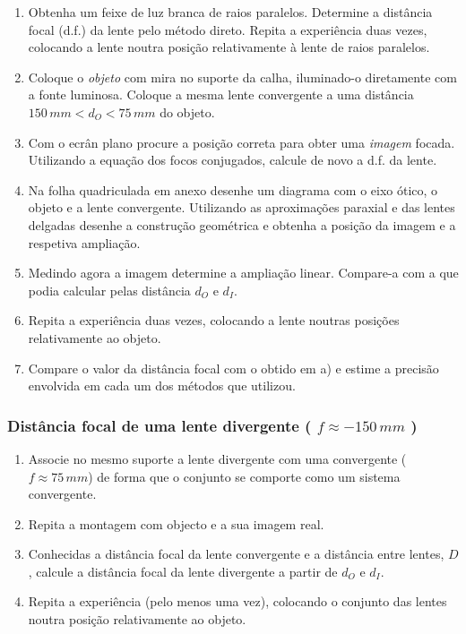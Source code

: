\documentclass[a4paper,12pt]{article}      %
\begin{document}
\begin{enumerate}
\item Obtenha  um  feixe  de  luz  branca  de  raios  paralelos.
Determine  a  distância  focal (d.f.)  da  lente pelo método direto.  Repita  a  experiência  duas  vezes,  colocando  a  lente 
noutra posição relativamente à lente de raios paralelos. 
\item Coloque o \emph{objeto} com mira no suporte da calha, iluminado-o diretamente com a fonte luminosa. Coloque a mesma lente convergente a uma distância $150\,mm < d_O < 75 \,mm$ do objeto.

\item Com o ecrân plano procure a posição correta para obter uma \emph{imagem} focada.
Utilizando a equação dos focos conjugados, calcule de novo a d.f. da lente. 
\item Na folha quadriculada em anexo desenhe um diagrama com o eixo ótico, o objeto e a lente convergente. Utilizando as aproximações paraxial e das lentes delgadas desenhe a construção geométrica e obtenha a posição da imagem e a respetiva ampliação.

\item Medindo agora a imagem determine a ampliação linear. Compare-a com a que podia  calcular pelas distância $d_O$  e $d_I$. 
\item Repita a experiência duas vezes, colocando a lente noutras posições relativamente ao objeto.  
\item Compare o valor da distância focal com o obtido em a) e estime a precisão envolvida em 
cada um dos métodos que utilizou. 
\end{enumerate}
	
\subsubsection{\sf   Distância focal de uma lente divergente ( $f  \approx   -150\, mm$ ) }
\begin{enumerate}
\item Associe  no  mesmo  suporte  a  lente  divergente  com  uma  convergente ($f  \approx 75\, mm$) de  forma  que  o 
conjunto se comporte como um sistema convergente.
\item Repita a montagem com objecto e a sua imagem real. 
\item Conhecidas  a  distância  focal  da  lente  convergente  e  a  distância  entre  lentes, $D$, calcule  a 
distância focal da lente divergente a partir de $d_O$  e $d_I$. 
\item Repita a experiência (pelo menos uma vez), colocando o conjunto das lentes noutra posição 
relativamente ao objeto. 


\end{enumerate}
	
\newpage
\def\width{18}
\def\hauteur{25}
\end{document}
